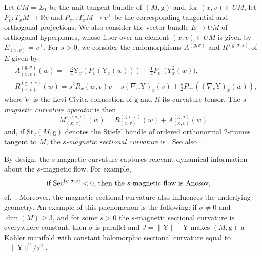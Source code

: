 \documentclass[10pt,a4paper]{amsart}
\newcommand{\g}{\mathrm{g}}
\newcommand{\Y}{\mathrm{Y}}
\numberwithin{equation}{section}
\theoremstyle{definition}
\begin{document}
Let $UM=\Sigma_1$ be the unit-tangent bundle of $(M,\g)$ and, for $(x,v)\in UM$, let ${P_v\colon T_xM \rightarrow \mathbb{R} v}$ and $P_{v^\perp}\colon T_xM \rightarrow v^\perp$ be the corresponding tangential and orthogonal projections. We also consider the vector bundle $E \rightarrow UM$ of orthogonal hyperplanes, whose fiber over an element $(x,v) \in UM$ is given by $E_{(x,v)} = v^\perp$. For $s > 0$, we consider the endomorphisms $A^{(g, \sigma)}$ and $R^{(g, \sigma, s)}$ of $E$ given by
\begin{equation}\label{R-and-A} \begin{split}
& A^{(\g,\sigma)}_{(x,v)}(w) = -\frac{3}{4} \Y_x(P_v(\Y_x(w))) - \frac{1}{4} P_{v^\perp}\bigl(\Y_x^2(w)\bigr), \\
& R^{(\g,\sigma,s)}_{(x,v)}(w) = s^2 R_x(w,v)v - s (\nabla_w \Y)_x(v) + \frac{s}{2} P_{v^\perp}((\nabla_v \Y)_x(w)),
\end{split} \end{equation}
where $\nabla$ is the Levi-Civita connection of $\g$ and $R$ its curvature tensor. The \emph{$s$-magnetic curvature operator} is then
\begin{equation*} M^{(g,\sigma,s)}_{(x,v)}(w) = R^{(\g,\sigma,s)}_{(x,v)}(w) + A^{(\g,\sigma)}_{(x,v)}(w)\end{equation*}and, if $\text{St}_2(M,\g)$ denotes the Stiefel bundle of ordered orthonormal $2$-frames tangent to $M$, the \emph{$s$-magnetic sectional curvature} \smash{$\text{Sec}^{(g,\sigma,s)} \colon \text{St}_2(M,\g) \rightarrow \mathbb{R}$} is \smash{$\text{Sec}^{(\g,\sigma,s)}_x(v,w) =\g_x\bigl(M^{(g,\sigma,s)}_{(x,v)}(w) , w\bigr)$}. See also \cite[Section 1.2]{assenza-imrn}.

By design, the $s$-magnetic curvature captures relevant dynamical information about the \mbox{$s$-magnetic} flow. For example, \begin{equation}\label{neg_sec_Anosov}
 \parbox{.7\textwidth}{if $\text{Sec}^{(g,\sigma,s)}<0$, then the $s$-magnetic flow is Anosov,}
\end{equation}cf.\
 \cite[Appendix A]{assenza2025magnetic}. Moreover, the magnetic sectional curvature also influences the underlying geometry. An example of this phenomenon is the following: if $\sigma \neq 0$ and $\dim(M) \geq 3$, and for some $s>0$ the $s$-magnetic sectional curvature is everywhere constant, then $\sigma$ is parallel and $J=\|\Y\|^{-1} \Y$ makes $(M,\g)$ a K\"ahler manifold with constant holomorphic sectional curvature equal to $-\|\Y\|^2/s^2$ \cite[Theorem D]{assenza2025magnetic}.
\end{document}
